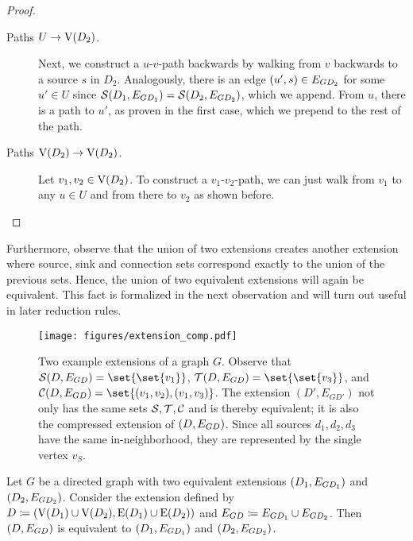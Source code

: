\begin{theorem}
\begin{lemma}
\begin{theorem}
\begin{proof}
\begin{description}
    \item[Paths $U \to \operatorname{V}({D_2})$.] Next, we construct a $u$-$v$-path backwards by walking from $v$ backwards to a source $s$ in $D_2$. Analogously, there is an edge $(u',s) \in E_{{G}{D_2}}$ for some $u' \in U$ since $\operatorname{\mathcal{S}}({D_1,E_{GD_1}}) = \operatorname{\mathcal{S}}({D_2,E_{GD_2}})$, which we append. From $u$, there is a path to $u'$, as proven in the first case, which we prepend to the rest of the path.

    \item [Paths $\operatorname{V}({D_2}) \to \operatorname{V}({D_2})$.] Let $v_1, v_2 \in \operatorname{V}({D_2})$. To construct a $v_1$-$v_2$-path, we can just walk from $v_1$ to any $u \in U$ and from there to $v_2$ as shown before.\qedhere
\end{description}
\end{proof}

Furthermore, observe that the union of two extensions creates another extension where source, sink and connection sets correspond exactly to the union of the previous sets. Hence, the union of two equivalent extensions will again be equivalent. This fact is formalized in the next observation and  will turn out useful in later reduction rules.

\begin{figure}
    \centering
    \texttt{[image: figures/extension\_comp.pdf]}
    \caption{Two example extensions of a graph $G$. Observe that $\source{D,\dexset} = \set{\set{v_1}}$, $\sink{D,\dexset} = \set{\set{v_3}}$, and $\conn{D,\dexset} = \set{(v_1,v_2), (v_1, v_3)}$. The extension $(D', E_{GD'})$ not only has the same sets $\operatorname{\mathcal{S}}, \operatorname{\mathcal{T}}, \operatorname{\mathcal{C}}$ and is thereby equivalent; it is also the compressed extension of $({D}, E_{{G}{D}})$. Since all sources $d_1,d_2,d_3$ have the same in-neighborhood, they are represented by the single vertex $v_S$.}
    \label{fig:extension_compression}
\end{figure}

\begin{observation} \label{lem:union_equiv_if_equiv}
  Let $G$ be a directed graph with two equivalent extensions $({D_{1}}, E_{{G}{D_{1}}})$ and $({D_{2}}, E_{{G}{D_{2}}})$. Consider the extension defined by $D \coloneqq (\operatorname{V}({D_1}) \cup \operatorname{V}({D_2}), \operatorname{E}({D_1}) \cup \operatorname{E}({D_2}))$ and $E_{{G}{D}} \coloneqq E_{{G}{D_1}} \cup E_{{G}{D_2}}$. Then $({D}, E_{{G}{D}})$ is equivalent to $({D_{1}}, E_{{G}{D_{1}}})$ and $({D_{2}}, E_{{G}{D_{2}}})$.
\end{observation}


\end{theorem}
\end{lemma}
\end{theorem}

